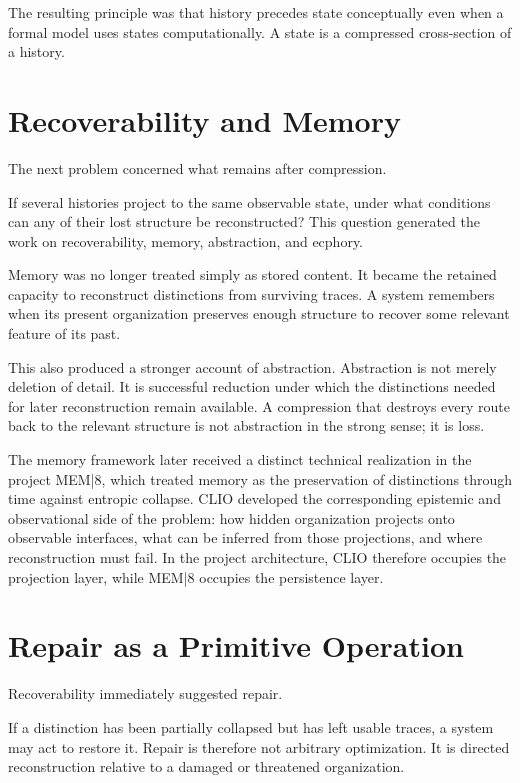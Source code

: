 \documentclass[11pt,oneside]{book}
\numberwithin{equation}{chapter}
\theoremstyle{definition}
\theoremstyle{plain}
\begin{document}
The resulting principle was that history precedes state conceptually even
when a formal model uses states computationally. A state is a compressed
cross-section of a history.

\section{Recoverability and Memory}

The next problem concerned what remains after compression.

If several histories project to the same observable state, under what
conditions can any of their lost structure be reconstructed? This question
generated the work on recoverability, memory, abstraction, and ecphory.

Memory was no longer treated simply as stored content. It became the
retained capacity to reconstruct distinctions from surviving traces. A
system remembers when its present organization preserves enough structure
to recover some relevant feature of its past.

This also produced a stronger account of abstraction. Abstraction is not
merely deletion of detail. It is successful reduction under which the
distinctions needed for later reconstruction remain available. A
compression that destroys every route back to the relevant structure is not
abstraction in the strong sense; it is loss.

The memory framework later received a distinct technical realization in the
project MEM|8, which treated memory as the preservation of distinctions
through time against entropic collapse. CLIO developed the corresponding
epistemic and observational side of the problem: how hidden organization
projects onto observable interfaces, what can be inferred from those
projections, and where reconstruction must fail. In the project
architecture, CLIO therefore occupies the projection layer, while MEM|8
occupies the persistence layer.

\section{Repair as a Primitive Operation}

Recoverability immediately suggested repair.

If a distinction has been partially collapsed but has left usable traces, a
system may act to restore it. Repair is therefore not arbitrary
optimization. It is directed reconstruction relative to a damaged or
threatened organization.
\end{document}
